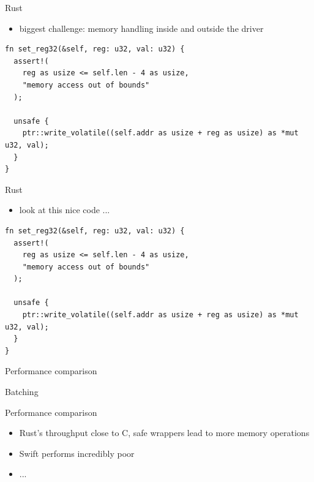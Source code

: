 \documentclass[NET,english,aspectratio=169,notitleframe,draft]{tumbeamer}
\begin{document}
\begin{frame}[fragile]{Rust}
\begin{itemize}
\item biggest challenge: memory handling inside and outside the driver
\end{itemize}
\begin{verbatim}
fn set_reg32(&self, reg: u32, val: u32) {
  assert!(
    reg as usize <= self.len - 4 as usize,
    "memory access out of bounds"
  );

  unsafe {
    ptr::write_volatile((self.addr as usize + reg as usize) as *mut u32, val);
  }
}
\end{verbatim}
\end{frame}

\begin{frame}[fragile]{Rust}
\begin{itemize}
\item look at this nice code ...
\end{itemize}
\begin{verbatim}
fn set_reg32(&self, reg: u32, val: u32) {
  assert!(
    reg as usize <= self.len - 4 as usize,
    "memory access out of bounds"
  );

  unsafe {
    ptr::write_volatile((self.addr as usize + reg as usize) as *mut u32, val);
  }
}
\end{verbatim}
\end{frame}

\begin{frame}{Performance comparison}
\centering
\end{frame}

\begin{frame}{Batching}
\centering
\end{frame}

\begin{frame}{Performance comparison}
\begin{itemize}
\item Rust's throughput close to C, safe wrappers lead to more memory operations
\item Swift performs incredibly poor
\item ...
\end{itemize}
\end{frame}
\end{document}
